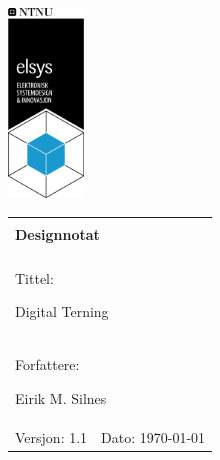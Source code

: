 \begin{minipage}[c]{0.15\textwidth}
\includegraphics[width=2.0cm]{Bilder/elsys_pos_staaende_ntnu.png}  
\end{minipage}
\begin{minipage}[c]{0.85\textwidth}

\renewcommand{\arraystretch}{1.7}
\large 
\begin{tabularx}{\textwidth}{|X|X|}
\hline
\multicolumn{2}{|l|}{} \\
\multicolumn{2}{|l|}{\huge \textbf{Designnotat}} \\
\multicolumn{2}{|l|}{}  \\
\hline
\multicolumn{2}{|l|}{Tittel: 

Digital Terning
} \\
\hline
\multicolumn{2}{|l|}{Forfattere: 

Eirik M. Silnes
} \\
\hline

Versjon: 1.1 & Dato: \today
\\
\hline 
\end{tabularx}
\end{minipage}
\normalsize